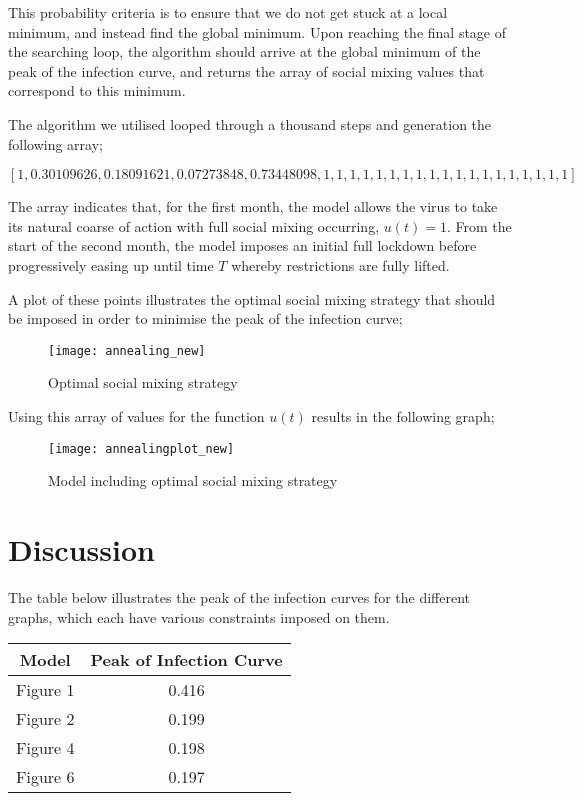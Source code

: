\documentclass[10pt]{article}
\begin{document}
This probability criteria is to ensure that we do not get stuck at a local minimum, and instead find the global minimum. Upon reaching the final stage of the searching loop, the algorithm should arrive at the global minimum of the peak of the infection curve, and returns the array of social mixing values that correspond to this minimum. \newline 

The algorithm we utilised looped through a thousand steps and generation the following array; \newline

$[1, 0.30109626, 0.18091621, 0.07273848, 0.73448098, 1, 1, 1, 1, 1, 1, 1, 1, 1, 1, 1, 1, 1, 1, 1, 1, 1, 1, 1]$ \newline

\noindent
The array indicates that, for the first month, the model allows the virus to take its natural coarse of action with full social mixing occurring, $u(t) = 1$. From the start of the second month, the model imposes an initial full lockdown before progressively easing up until time $T$ whereby restrictions are fully lifted.

\noindent
A plot of these points illustrates the optimal social mixing strategy that should be imposed in order to minimise the peak of the infection curve;

\begin{figure}[H]
\caption{Optimal social mixing strategy}
\centerline{\texttt{[image: annealing\_new]}}
\end{figure}

\noindent
Using this array of values for the function $u(t)$ results in the following graph;

\begin{figure}[H]
\caption{Model including optimal social mixing strategy}
\centerline{\texttt{[image: annealingplot\_new]}}
\end{figure}

\section{Discussion}

\noindent
The table below illustrates the peak of the infection curves for the different graphs, which each have various constraints imposed on them.

\begin{center}
\begin{tabular}{ |c|c| }
Model & Peak of Infection Curve \\ [0.5ex]
\hline\hline
 Figure 1 & 0.416 \\ 
 Figure 2 & 0.199 \\  
 Figure 4 & 0.198 \\
 Figure 6 & 0.197
\end{tabular}
\end{center}
\end{document}
